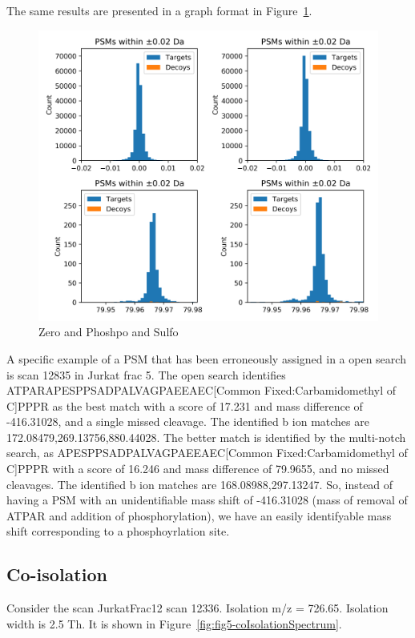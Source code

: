 \documentclass[journal=jprobs,manuscript=article]{achemso}
\begin{document}
The same results are presented in a graph format in Figure~\ref{fig:fig6-ZeroAndPhospho}.

\begin{figure}[H]
\includegraphics{fig6-ZeroAndPhospho.png}
\caption{Zero and Phoshpo and Sulfo}
\label{fig:fig6-ZeroAndPhospho}
\end{figure}

A specific example of a PSM that has been erroneously assigned in a open search is scan 12835 in Jurkat frac 5.
The open search identifies ATPARAPESPPSADPALVAGPAEEAEC[Common Fixed:Carbamidomethyl of C]PPPR as the best match with a score of 17.231 and mass difference of -416.31028, and a single missed cleavage.
The identified b ion matches are 172.08479,269.13756,880.44028.
The better match is identified by the multi-notch search, as APESPPSADPALVAGPAEEAEC[Common Fixed:Carbamidomethyl of C]PPPR with a score of 16.246 and mass difference of 79.9655, and no missed cleavages.
The identified b ion matches are 168.08988,297.13247.
So, instead of having a PSM with an unidentifiable mass shift of -416.31028 (mass of removal of ATPAR and addition of phosphorylation), we have an easily identifyable mass shift corresponding to a phosphoyrlation site.

\subsection{Co-isolation}


Consider the scan JurkatFrac12 scan 12336. Isolation m/z  = 726.65.
Isolation width is 2.5 Th.
It is shown in Figure~\ref{fig:fig5-coIsolationSpectrum}.
\end{document}
